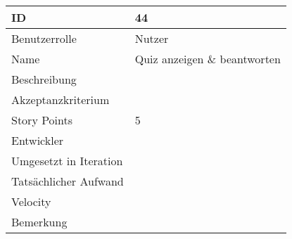 \begin{tabularx}{\textwidth}{|p{}|X|}
	\hline
	ID & 44\\
	\hline
	Benutzerrolle & Nutzer\\
	\hline
	Name & Quiz anzeigen \& beantworten\\
	\hline
	Beschreibung & \\
	\hline
	Akzeptanzkriterium & \\
	\hline
	Story Points & 5\\
	\hline
	Entwickler & \\
	\hline
	Umgesetzt in Iteration & \\ 
	\hline
	Tatsächlicher Aufwand & \\
	\hline
	Velocity & \\
	\hline
	Bemerkung & \\
	\hline
\end{tabularx}
\vspace{20pt}
